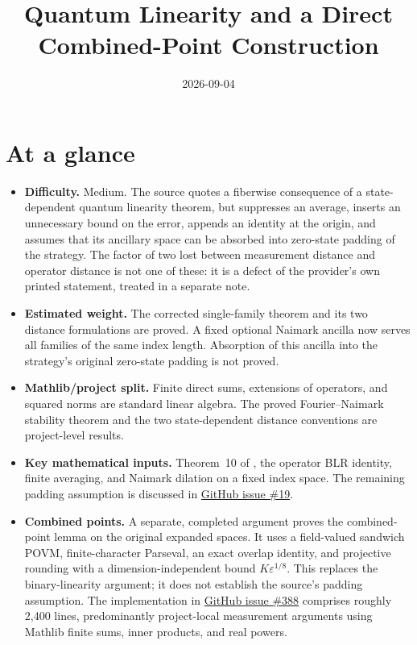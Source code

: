 \documentclass[11pt]{article}
\title{Quantum Linearity and a Direct Combined-Point Construction}
\author{}
\date{2026-09-04}
\renewcommand{\ghissue}[1]{%
  \href{https://github.com/Dengnifer/MIPStarRE-QPBT/issues/#1}{GitHub issue \##1}}
\begin{document}
\maketitle

\section{At a glance}

\begin{itemize}
  \item \textbf{Difficulty.} Medium.  The source quotes a fiberwise consequence
  of a state-dependent quantum linearity theorem, but suppresses an average,
  inserts an unnecessary bound on the error, appends an identity at the origin,
  and assumes that its ancillary space can be absorbed into zero-state padding
  of the strategy. The factor of two lost between measurement distance and
  operator distance is not one of these: it is a defect of the provider's own printed statement, treated
  in a separate note.
  \item \textbf{Estimated weight.} The corrected single-family theorem and its
  two distance formulations are proved. A fixed optional Naimark ancilla now
  serves all families of the same index length. Absorption of this ancilla
  into the strategy's original zero-state padding is not proved.
  \item \textbf{Mathlib/project split.} Finite direct sums, extensions of
  operators, and squared norms are standard linear algebra.  The proved
  Fourier--Naimark stability theorem and the two state-dependent distance
  conventions are project-level results.
  \item \textbf{Key mathematical inputs.} Theorem~10 of
  \cite{Natarajan2017Linearity}, the operator BLR identity, finite averaging,
  and Naimark dilation on a fixed index space. The remaining padding
  assumption is discussed in \ghissue{19}.
  \item \textbf{Combined points.} A separate, completed argument proves the
  combined-point lemma on the original expanded spaces.  It uses a
  field-valued sandwich POVM, finite-character Parseval, an exact overlap
  identity, and projective rounding with a dimension-independent bound
  $K\varepsilon^{1/8}$.  This replaces the binary-linearity argument; it does
  not establish the source's padding assumption. The implementation in
  \ghissue{388} comprises roughly 2,400 lines, predominantly project-local
  measurement arguments using Mathlib finite sums, inner products, and real
  powers.
\end{itemize}
\end{document}
